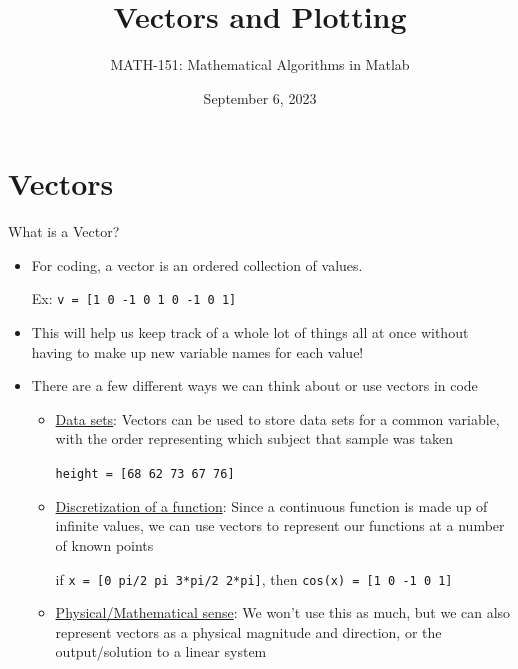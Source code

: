 {}\documentclass[letterpaper,
compress,
xcolor=x11names,
]{beamer}
\begin{document}
	\title{Vectors and Plotting}
	\author{MATH-151:  Mathematical Algorithms in Matlab}
	\date[202X]{September 6, 2023}




\begin{frame}
\titlepage
\end{frame}
\section{Vectors}

\begin{frame}{What is a Vector?}
	\footnotesize
	\begin{itemize}
		\item For coding, a vector is an ordered collection of values.
		\begin{center}
			Ex: \texttt{v = [1 0 -1 0 1 0 -1 0 1]}
		\end{center}
		\item This will help us keep track of a whole lot of things all at once without having to make up new variable names for each value!
		\item There are a few different ways we can think about or use vectors in code
		\begin{itemize}
			\item \underline{Data sets}: Vectors can be used to store data sets for a common variable, with the order representing which subject that sample was taken
			\begin{center}
				\texttt{height = [68 62 73 67 76]}
			\end{center}
			\item \underline{Discretization of a function}: Since a continuous function is made up of infinite values, we can use vectors to represent our functions at a number of known points
			\begin{center}
				if \texttt{x = [0 pi/2 pi 3*pi/2 2*pi]}, then \texttt{cos(x) = [1 0 -1 0 1]}
			\end{center}
			\item \underline{Physical/Mathematical sense}: We won't use this as much, but we can also represent vectors as a physical magnitude and direction, or the output/solution to a linear system
		\end{itemize}
	\end{itemize}
\end{frame}
\end{document}
